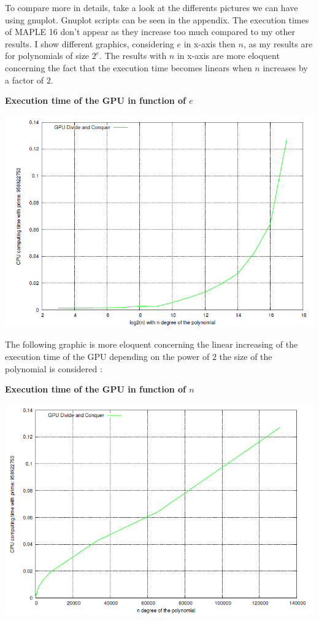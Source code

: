 To compare more in details, take a look at the differents pictures we can have using gnuplot. Gnuplot scripts can be seen in the appendix. The execution times of MAPLE 16 don't appear as they increase too much compared to my other results. I show different graphics, considering $e$ in x-axis then $n$, as my results are for polynomials of size $2^e$. The results with $n$ in x-axis are more eloquent concerning the fact that the execution time becomes linears when $n$ increases by a factor of $2$.\\

\begin{center}
\textbf{Execution time of the GPU in function of $e$}
\end{center}

\begin{center}
\includegraphics[scale=0.8]{eps/GPUtime_e.png}
\end{center}

The following graphic is more eloquent concerning the linear increasing of the execution time of the GPU depending on the power of $2$ the size of the polynomial is considered :\\

\begin{center}
\textbf{Execution time of the GPU in function of $n$}\\
\end{center}

\begin{center}
\includegraphics[scale=0.8]{eps/GPUtime_n.png}
\end{center}

